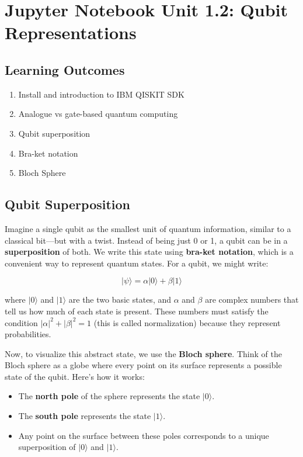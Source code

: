     \hypertarget{unit-1.2-qubit-representations}{%
\section{Jupyter Notebook Unit 1.2: Qubit
Representations}\label{unit-1.2-qubit-representations}}

\hypertarget{learning-outcomes}{%
\subsection*{Learning Outcomes}\label{learning-outcomes}}

\begin{enumerate}
\def\labelenumi{\arabic{enumi}.}
\tightlist
\item
  Install and introduction to IBM QISKIT SDK
\item
  Analogue vs gate-based quantum computing
\item
  Qubit superposition
\item
  Bra-ket notation
\item
  Bloch Sphere
\end{enumerate}

    \hypertarget{qubit-superposition}{%
\subsection*{Qubit Superposition}\label{qubit-superposition}}

Imagine a single qubit as the smallest unit of quantum information,
similar to a classical bit---but with a twist. Instead of being just 0
or 1, a qubit can be in a \textbf{superposition} of both. We write this
state using \textbf{bra-ket notation}, which is a convenient way to
represent quantum states. For a qubit, we might write:

\[
|\psi\rangle = \alpha|0\rangle + \beta|1\rangle
\]

where \(|0\rangle\) and \(|1\rangle\) are the two basic states, and
\(\alpha\) and \(\beta\) are complex numbers that tell us how much of
each state is present. These numbers must satisfy the condition
\(|\alpha|^2 + |\beta|^2 = 1\) (this is called normalization) because
they represent probabilities.

    Now, to visualize this abstract state, we use the \textbf{Bloch sphere}.
Think of the Bloch sphere as a globe where every point on its surface
represents a possible state of the qubit. Here's how it works:

\begin{itemize}
\tightlist
\item
  The \textbf{north pole} of the sphere represents the state
  \(|0\rangle\).
\item
  The \textbf{south pole} represents the state \(|1\rangle\).
\item
  Any point on the surface between these poles corresponds to a unique
  superposition of \(|0\rangle\) and \(|1\rangle\).
\end{itemize}

